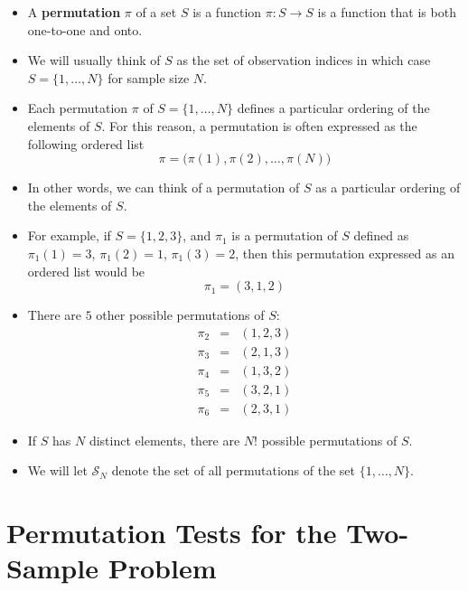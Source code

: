 \documentclass[]{book}
\begin{document}
\begin{itemize}
\item
  A \textbf{permutation} \(\pi\) of a set \(S\) is a function \(\pi: S \longrightarrow S\) is a
  function that is both one-to-one and onto.
\item
  We will usually think of \(S\) as the set of observation indices in which case
  \(S = \{1, \ldots, N\}\) for sample size \(N\).
\item
  Each permutation \(\pi\) of \(S = \{1, \ldots, N\}\) defines a particular ordering of the elements of \(S\).
  For this reason, a permutation is often expressed as the following ordered list
  \begin{equation}
  \pi = \big( \pi(1), \pi(2), \ldots, \pi(N)  \big) \nonumber 
  \end{equation}
\item
  In other words, we can think of a permutation of \(S\)
  as a particular ordering of the elements of \(S\).
\item
  For example, if \(S = \{1,2,3\}\), and \(\pi_{1}\) is a permutation of \(S\)
  defined as \(\pi_{1}(1) = 3\), \(\pi_{1}(2) = 1\), \(\pi_{1}(3) = 2\), then
  this permutation expressed as an ordered list would be
  \begin{equation}
  \pi_{1} = (3, 1, 2)  \nonumber
  \end{equation}
\item
  There are \(5\) other possible permutations of \(S\):
  \begin{eqnarray}
  \pi_{2} &=& (1,2,3) \nonumber \\
  \pi_{3} &=& (2,1,3) \nonumber \\
  \pi_{4} &=& (1,3,2) \nonumber \\
  \pi_{5} &=& (3,2,1) \nonumber \\
  \pi_{6} &=& (2, 3, 1) \nonumber  
  \end{eqnarray}
\item
  If \(S\) has \(N\) distinct elements, there are \(N!\) possible permutations of \(S\).
\item
  We will let \(\mathcal{S}_{N}\) denote the set of all permutations of the
  set \(\{1, \ldots, N\}\).
\end{itemize}

\hypertarget{permutation-tests-for-the-two-sample-problem}{%
\section{Permutation Tests for the Two-Sample Problem}\label{permutation-tests-for-the-two-sample-problem}}
\end{document}
